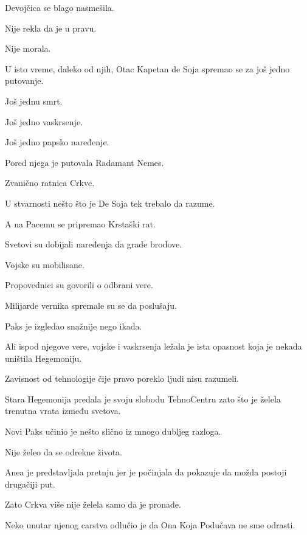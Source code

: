 \bigskip

Devojčica se blago nasmešila.

Nije rekla da je u pravu.

Nije morala.

\bigskip

U isto vreme, daleko od njih, Otac Kapetan de Soja spremao se za još jedno putovanje.

Još jednu smrt.

Još jedno vaskrsenje.

Još jedno papsko naređenje.

\bigskip

Pored njega je putovala Radamant Nemes.

Zvanično ratnica Crkve.

U stvarnosti nešto što je De Soja tek trebalo da razume.

\bigskip

A na Pacemu se pripremao Krstaški rat.

Svetovi su dobijali naređenja da grade brodove.

Vojske su mobilisane.

Propovednici su govorili o odbrani vere.

Milijarde vernika spremale su se da poslušaju.

\bigskip

Paks je izgledao snažnije nego ikada.

Ali ispod njegove vere, vojske i vaskrsenja ležala je ista opasnost koja je nekada uništila Hegemoniju.

Zavisnost od tehnologije čije pravo poreklo ljudi nisu razumeli.

\bigskip

Stara Hegemonija predala je svoju slobodu TehnoCentru zato što je želela trenutna vrata između svetova.

Novi Paks učinio je nešto slično iz mnogo dubljeg razloga.

Nije želeo da se odrekne života.

\bigskip

Anea je predstavljala pretnju jer je počinjala da pokazuje da možda postoji drugačiji put.

Zato Crkva više nije želela samo da je pronađe.

Neko unutar njenog carstva odlučio je da Ona Koja Podučava ne sme odrasti.